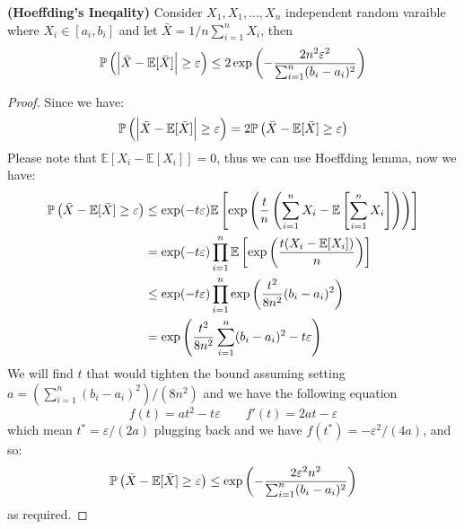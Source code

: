 \begin{theorem}{\textbf{(Hoeffding's Ineqality)}}
    Consider $X_1, X_1,\dots,X_n$ independent random varaible where $X_i\in[a_i, b_i]$ and let $\bar{X}=1/n\sum^n_{i=1}X_i$, then 
    \begin{equation*}
        \mathbb{P}\left( \Big| \bar{X} - \mathbb{E}[\bar{X}] \Big|\ge\varepsilon \right) \le 2 \exp\left( -\frac{2n^2\varepsilon^2}{\sum^n_{i=1}(b_i-a_i)^2} \right)
    \end{equation*}
\end{theorem}
\begin{proof}
    Since we have:
    \begin{equation*}
        \mathbb{P}\left( \Big| \bar{X} - \mathbb{E}[\bar{X}] \Big|\ge\varepsilon \right) = 2 \mathbb{P}\left( \bar{X} - \mathbb{E}[\bar{X}] \ge\varepsilon \right)
    \end{equation*}
    Please note that $\mathbb{E}[X_i - \mathbb{E}[X_i]] = 0$, thus we can use Hoeffding lemma, now we have:
    \begin{equation*}
    \begin{aligned}
        \mathbb{P}\left(  \bar{X} - \mathbb{E}[\bar{X}] \ge\varepsilon \right) &\le \exp(-t\varepsilon)\mathbb{E}\left[ \exp\left( \frac{t}{n}\left( \sum^n_{i=1}X_i - \mathbb{E}\left[ \sum^n_{i=1}X_i \right] \right) \right) \right] \\
        &= \exp(-t\varepsilon)\prod^n_{i=1}\mathbb{E}\left[ \exp\left( \frac{t(X_i - \mathbb{E}[X_i])}{n} \right) \right] \\
        &\le \exp(-t\varepsilon)\prod^n_{i=1}\exp\left( \frac{t^2}{8n^2}(b_i-a_i)^2 \right)\\
        &= \exp\left( \frac{t^2}{8n^2}\sum_{i=1}^n(b_i-a_i)^2 - t\varepsilon \right)
    \end{aligned}
    \end{equation*}
    We will find $t$ that would tighten the bound assuming setting $a = (\sum_{i=1}^n(b_i-a_i)^2)/(8n^2)$ and we have the following equation
    \begin{equation*}
        f(t) = at^2 - t\varepsilon \qquad f'(t) = 2at - \varepsilon
    \end{equation*}
    which mean $t^* = \varepsilon/(2a)$ plugging back and we have $f(t^*) = -\varepsilon^2/(4a)$, and so:
    \begin{equation*}
        \mathbb{P}\left(  \bar{X} - \mathbb{E}[\bar{X}] \ge\varepsilon \right) \le \exp\left( -\frac{2\varepsilon^2n^2}{\sum_{i=1}^n(b_i-a_i)^2} \right)
    \end{equation*}
    as required.
\end{proof}

